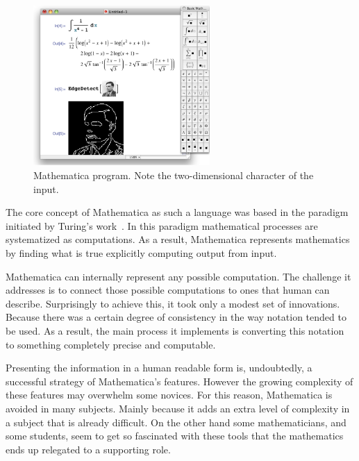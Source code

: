 \begin{figure}
  \vspace{-35pt}
  \begin{center}
    \includegraphics[width=0.6\textwidth]{img/mathematica}
  \end{center}
  \vspace{-23pt}
 \caption{Mathematica program. Note the two-dimensional character of the input.}  
  \vspace{-25pt}
    \label{fig:math}
\end{figure}

The core concept of Mathematica as such a language was based in the paradigm initiated by Turing's work~\cite{wolfram2003wolfram}. In this paradigm mathematical processes are systematized as computations. As a result, Mathematica represents mathematics by finding what is true explicitly computing output from input. 

Mathematica can internally represent any possible computation. The challenge it addresses is to connect those possible computations to ones that human can describe. Surprisingly to achieve this, it took only a modest set of innovations. Because there was a certain degree of consistency in the way notation tended to be used. As a result, the main process it implements is converting this notation to something completely precise and computable. 

Presenting the information in a human readable form is, undoubtedly, a successful strategy of Mathematica's features. However the growing complexity of these features may overwhelm some novices. For this reason, Mathematica is avoided in many subjects. Mainly because it adds an extra level of complexity in a subject that is already difficult. On the other hand some mathematicians, and some students, seem to get so fascinated with these tools that the mathematics ends up relegated to a supporting role.
